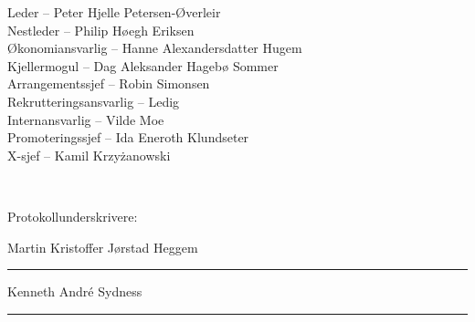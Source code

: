 \documentclass[10pt,norsk,a4paper,usenames,dvipsnames]{article}
\begin{document}
\begin{center}
    \LARGE Leder -- Peter Hjelle Petersen-Øverleir
    \\ Nestleder -- Philip Høegh Eriksen
    \\ Økonomiansvarlig -- Hanne Alexandersdatter Hugem
    \\ Kjellermogul -- Dag Aleksander Hagebø Sommer
    \\ Arrangementssjef -- Robin Simonsen
    \\ Rekrutteringsansvarlig -- Ledig
    \\ Internansvarlig -- Vilde Moe
    \\ Promoteringssjef -- Ida Eneroth Klundseter
    \\ X-sjef -- Kamil K\MakeLowercase{RZYŻANOWSKI}
\end{center}

\mbox{}
\\[24pt]

\begin{center}
\LARGE Protokollunderskrivere:\\[30pt]

\begin{multicols}{2}
    \Large 
    Martin Kristoffer Jørstad Heggem\\[48pt]
    \rule{220pt}{1pt}
    
    Kenneth André Sydness\\[48pt]
    \rule{220pt}{1pt}
    
    
\end{multicols}
\end{center}
\end{document}
